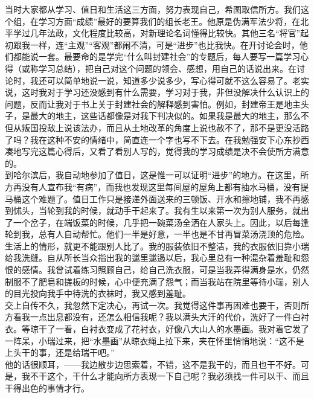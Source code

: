 当时大家都从学习、值日和生活这三方面，努力表现自己，希图取信所方。我们这个组，在学习方面“成绩”最好的要算我们的组长老王。他原是伪满军法少将，在北平学过几年法政，文化程度比较高，对新理论名词懂得比较快。其他三名“将官”起初跟我一样，连“主观”“客观”都闹不清，可是“进步”也比我快。在开讨论会时，他们都能说一套。最要命的是学完“什么叫封建社会”的专题后，每人要写一篇学习心得（或称学习总结），把自己对这个问题的领会、感想，用自己的话说出来。在讨论时，我还可以简单地说一说，知道多少说多少，写心得可就不这么容易了。老实说，这时我对于学习还没感到有什么需要，学习对于我，非但没解决什么认识上的问题，反而让我对于书上关于封建社会的解释感到害怕。例如，封建帝王是地主头子，是最大的地主，这些话都像是对我下判决似的。如果我是最大的地主，那么不但从叛国投敌上说该法办，而且从土地改革的角度上说也赦不了，那不是更没活路了吗？我在这种不安的情绪中，简直连一个字也写不下去。在我勉强安下心东抄西凑地写完这篇心得后，又看了看别人写的，觉得我的学习成绩是决不会使所方满意的。\\

到哈尔滨后，我自动地参加了值日，这是惟一可以证明“进步”的地方。在这里，所方再没有人宣布我“有病”，而我也发现这里每间屋的屋角上都有抽水马桶，没有提马桶这个难题了。值日工作只是接递外面送来的三顿饭、开水和擦地铺，我不再感到怵头，当轮到我的时候，就动手干起来了。我有生以来第一次为别人服务，就出了一个岔子，在端饭菜的时候，几乎把一碗菜汤全洒在人家头上。因此，以后每逢轮到我，总有人自动帮忙。他们一半是好意，一半也是不甘再冒菜汤浇顶的危险。\\

生活上的情形，就更不能跟别人比了。我的服装依旧不整洁，我的衣服依旧靠小瑞给我洗缝。自从所长当众指出我的邋里邋遏以后，我心里总有一种混杂着羞耻和怨恨的感情。我曾试着练习照顾自己，给自己洗衣服，可是当我弄得满身是水，仍然制服不了肥皂和搓板的时候，心中便充满了怨气；而当我站在院里等待小瑞，别人的目光投向我手中待洗的衣袜时，我又感到羞耻。\\

交上自传不久，我忽然下定决心，再试一次。我觉得这件事再困难也要干，否则所方看我一点出息都没有，还怎么相信我呢？我以满头大汗的代价，洗好了一件白衬衣。等晾干了一看，白衬衣变成了花衬衣，好像八大山人的水墨画。我对着它发了一阵呆，小瑞过来，把“水墨画”从晾衣绳上拉下来，夹在怀里悄悄地说：“这不是上头干的事，还是给瑞干吧。”\\

他的话很顺耳，——我边散步边思索着，不错，这不是我干的，而且也干不好。可是，我不干这个，干什么才能向所方表现一下自己呢？我必须找一件可以干、而且干得出色的事情才行。\\


